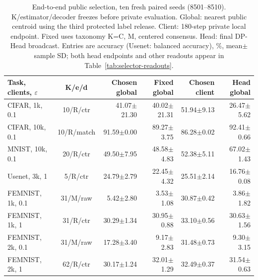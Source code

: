 \begin{table}[t]
\caption{End-to-end public selection, ten fresh paired seeds (8501--8510). K/estimator/decoder freezes before private evaluation. Global: nearest public centroid using the third protected label release. Client: 180-step private local endpoint. Fixed uses taxonomy K=C, M, centered consensus. Head: final DP-Head broadcast. Entries are accuracy (Usenet: balanced accuracy), \%, mean$\pm$sample SD; both head endpoints and other readouts appear in Table~\ref{tab:selector-readouts}.}
\label{tab:selector-e2e}\small
\centering
\begin{tabular}{@{}lcrrrr@{}}\toprule
Task, clients, $\varepsilon$ & K/e/d & Chosen global & Fixed global & Chosen client & Head global \\
\midrule
CIFAR, 1k, 0.1 & 10/R/ctr & 41.07$\pm$21.30 & 40.02$\pm$21.31 & 51.94$\pm$9.13 & 26.47$\pm$5.62 \\
CIFAR, 10k, 0.1 & 10/R/match & 91.59$\pm$0.00 & 89.27$\pm$3.75 & 86.28$\pm$0.02 & 92.41$\pm$0.66 \\
MNIST, 10k, 0.1 & 20/R/ctr & 49.50$\pm$7.95 & 48.58$\pm$4.83 & 52.38$\pm$5.11 & 67.02$\pm$1.43 \\
Usenet, 3k, 1 & 5/R/ctr & 24.79$\pm$2.79 & 22.45$\pm$4.32 & 25.51$\pm$2.14 & 16.76$\pm$0.08 \\
FEMNIST, 1k, 0.1 & 31/M/raw & 5.42$\pm$2.80 & 3.53$\pm$1.08 & 30.87$\pm$0.42 & 3.86$\pm$1.82 \\
FEMNIST, 1k, 1 & 31/R/ctr & 30.29$\pm$1.34 & 30.95$\pm$0.88 & 33.10$\pm$0.56 & 30.63$\pm$1.56 \\
FEMNIST, 2k, 0.1 & 31/M/raw & 17.28$\pm$3.40 & 9.17$\pm$2.83 & 31.48$\pm$0.73 & 9.30$\pm$3.15 \\
FEMNIST, 2k, 1 & 62/R/ctr & 30.17$\pm$1.24 & 32.01$\pm$1.29 & 32.49$\pm$0.37 & 31.54$\pm$0.63 \\
\bottomrule\end{tabular}
\end{table}
